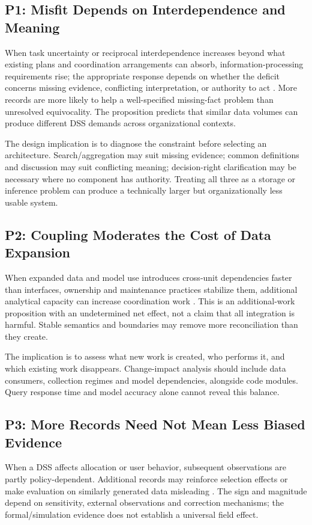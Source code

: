 \documentclass[journal]{IEEEtran}
\begin{document}
\subsection{P1: Misfit Depends on Interdependence and Meaning}
When task uncertainty or reciprocal interdependence increases beyond what existing plans and coordination arrangements can absorb, information-processing requirements rise; the appropriate response depends on whether the deficit concerns missing evidence, conflicting interpretation, or authority to act \cite{GALBRAITH1974,TUSHMAN1978,DAFT1986}. More records are more likely to help a well-specified missing-fact problem than unresolved equivocality. The proposition predicts that similar data volumes can produce different DSS demands across organizational contexts.

The design implication is to diagnose the constraint before selecting an architecture. Search/aggregation may suit missing evidence; common definitions and discussion may suit conflicting meaning; decision-right clarification may be necessary where no component has authority. Treating all three as a storage or inference problem can produce a technically larger but organizationally less usable system.

\subsection{P2: Coupling Moderates the Cost of Data Expansion}
When expanded data and model use introduces cross-unit dependencies faster than interfaces, ownership and maintenance practices stabilize them, additional analytical capacity can increase coordination work \cite{chaudhuri1997,amershi2019,sculley2015}. This is an additional-work proposition with an undetermined net effect, not a claim that all integration is harmful. Stable semantics and boundaries may remove more reconciliation than they create.

The implication is to assess what new work is created, who performs it, and which existing work disappears. Change-impact analysis should include data consumers, collection regimes and model dependencies, alongside code modules. Query response time and model accuracy alone cannot reveal this balance.

\subsection{P3: More Records Need Not Mean Less Biased Evidence}
When a DSS affects allocation or user behavior, subsequent observations are partly policy-dependent. Additional records may reinforce selection effects or make evaluation on similarly generated data misleading \cite{perdomo2020,chaney2018,ensign2018}. The sign and magnitude depend on sensitivity, external observations and correction mechanisms; the formal/simulation evidence does not establish a universal field effect.
\end{document}
